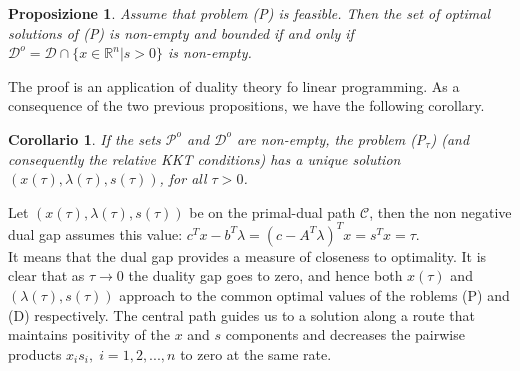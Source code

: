 \documentclass[a4paper,10 pt,titlepage,twoside]{book}
\theoremstyle{plain}
\newtheorem{cor}[thm]{Corollario}
\newtheorem{prop}[thm]{Proposizione}
\theoremstyle{definition}
\theoremstyle{remark}
\begin{document}
\begin{prop}
	Assume that problem (P) is feasible. Then the set of optimal solutions of (P) is non-empty and bounded if and only if $\mathcal{D}^{o} = \mathcal{D}\cap\{x\in\mathbb{R}^{n}| s> 0\}$  is non-empty.
\end{prop}
The proof is an application of duality theory fo linear programming. As a consequence of the two previous propositions, we have the following corollary.
\begin{cor}
If the sets $\mathcal{P}^{o}$ and $\mathcal{D}^{o}$ are non-empty, the problem (P$_{\tau}$) (and consequently the relative KKT conditions) has a unique solution $(x(\tau),\lambda(\tau),s(\tau))$, for all $\tau>0$. 
\end{cor}
Let $(x(\tau), \lambda(\tau), s(\tau))$ be on the primal-dual path $\mathcal{C}$, then the non negative dual gap assumes this value: $c^{T}x-b^{T}\lambda=\left(c-A^{T}\lambda\right)^{T}x=s^{T}x=\tau$.\\
It means that the dual gap provides a measure of closeness to optimality. It is clear that as $\tau\to0$ the duality gap goes to zero, and hence both $x(\tau)$ and
 $(\lambda(\tau), s(\tau))$ approach to the common optimal values of the roblems (P) and (D) respectively. The central path guides us to a solution along a route that maintains positivity of the $x$ and $s$ components and decreases the pairwise products $x_{i}s_{i},\;i = 1,2,...,n$ to zero at the same rate.\\
 
\end{document}
